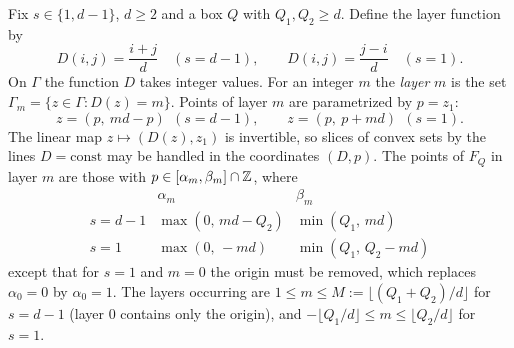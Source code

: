 Fix $s\in\{1,d-1\}$, $d\ge2$ and a box $Q$ with $Q_1,Q_2\ge d$. Define the layer function by
\[
  D(i,j)=\frac{i+j}d\quad(s=d-1),\qquad D(i,j)=\frac{j-i}d\quad(s=1).
\]
On $\Gamma$ the function $D$ takes integer values. For an integer $m$ the \emph{layer} $m$ is the set $\Gamma_m=\{z\in\Gamma:D(z)=m\}$. Points of layer $m$ are parametrized by $p=z_1$:
\[
  z=(p,\ md-p)\ \ (s=d-1),\qquad z=(p,\ p+md)\ \ (s=1).
\]
The linear map $z\mapsto(D(z),z_1)$ is invertible, so slices of convex sets by the lines $D=\mathrm{const}$ may be handled in the coordinates $(D,p)$. The points of $F_Q$ in layer $m$ are those with $p\in[\alpha_m,\beta_m]\cap\mathbb Z$, where
\[
\begin{array}{c|cc}
 & \alpha_m & \beta_m\\\hline
s=d-1 & \max(0,\,md-Q_2) & \min(Q_1,\,md)\\
s=1 & \max(0,\,-md) & \min(Q_1,\,Q_2-md)
\end{array}
\]
except that for $s=1$ and $m=0$ the origin must be removed, which replaces $\alpha_0=0$ by $\alpha_0=1$. The layers occurring are $1\le m\le M:=\lfloor(Q_1+Q_2)/d\rfloor$ for $s=d-1$ (layer $0$ contains only the origin), and $-\lfloor Q_1/d\rfloor\le m\le\lfloor Q_2/d\rfloor$ for $s=1$.


